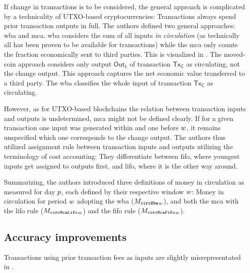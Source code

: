 If change in transactions is to be considered, the general approach is complicated by a technicality of UTXO-based cryptocurrencies: Transactions always spend prior transaction outputs in full. %
The authors defined two general approaches: \ac{wba} and \ac{mca}.  %
\ac{wba} considers the sum of all inputs \textit{in circulation} (as technically all has been proven to be available for transactions) while the \ac{mca} only counts the fraction economically sent to third parties.  %
%
This is visualized in .  %
The moved-coin approach considers only output $\mathsf{Out_1}$ of transaction $\mathsf{Tx_C}$ as circulating, not the change output.  %
This approach captures the net economic value transferred to a third party.  %
The \ac{wba} classifies the whole input of transaction $\mathsf{Tx_C}$ as circulating.  %

However, as for UTXO-based blockchains the relation between transaction inputs and outputs is undetermined, \ac{mca} might not be defined clearly. %
If for a given transaction one input was generated within and one before ${w}$, it remains unspecified which one corresponds to the change output.  %
The authors thus utilized assignment rule between transaction inputs and outputs utilizing the terminology of cost accounting: %
They differentiate between \ac{fifo}, where youngest inputs get assigned to outputs first, and \ac{lifo}, where it is the other way around.  %

Summarizing, the authors introduced three definitions of money in circulation as measured for day \({p}\), each defined by their respective window \({w}\): %
Money in circulation for period ${w}$ adopting the \ac{wba} ($ {{M_{\mathtt{circWba}}}_{w}} $), and both the \ac{mca} with the \ac{lifo} rule ($ {{M_{\mathtt{circMcaLifo}}}_{w}} $) and the \ac{fifo} rule ($ {{M_{\mathtt{circMcaFifo}}}_{w}} $).


\subsection{Accuracy improvements}
\label{sec:inaccuracy_fees}%
Transactions using prior transaction fees as inputs are slightly misrepresentated in \cite{pernice2019cryptocurrencies}. %

